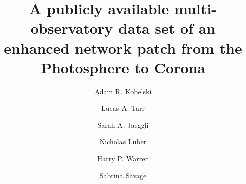 \documentclass[twocolumn]{aastex62}
\begin{document}
\title{A publicly available multi-observatory data set of an enhanced network patch from the Photosphere to Corona}

\author[0000-0002-4691-1729]{Adam R. Kobelski}


\author[0000-0002-8259-8303]{Lucas A. Tarr}
\author[0000-0001-5459-2628]{Sarah A. Jaeggli}
\author{Nicholas Luber}
\author[0000-0001-6102-6851]{Harry P. Warren}
\author[0000-0002-6172-0517]{Sabrina Savage}
\end{document}
